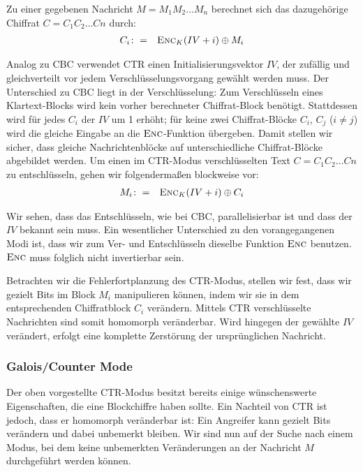 \noindent Zu einer gegebenen Nachricht \(M = M_1M_2 \dots M_n\) berechnet sich das dazugehörige Chiffrat \(C = C_1C_2 \dots Cn\) durch:
\begin{eqnarray*}
	C_i	& \colon=	& \textsc{Enc}_{K}(IV + i) \oplus M_i
\end{eqnarray*}

Analog zu CBC verwendet CTR einen Initialisierungsvektor \(IV\), der zufällig und gleichverteilt vor jedem Verschlüsselungsvorgang gewählt werden muss. Der Unterschied zu CBC liegt in der Verschlüsselung: Zum Verschlüsseln eines Klartext-Blocks wird kein vorher berechneter Chiffrat-Block benötigt. Stattdessen wird für jedes \(C_i\) der \(IV\) um 1 erhöht; für keine zwei Chiffrat-Blöcke \(C_i\), \(C_j\) (\(i \neq j\)) wird die gleiche Eingabe an die \(\textsc{Enc}\)-Funktion übergeben. Damit stellen wir sicher, dass gleiche Nachrichtenblöcke auf unterschiedliche Chiffrat-Blöcke abgebildet werden. Um einen im CTR-Modus verschlüsselten Text \(C = C_1C_2 \dots Cn\) zu entschlüsseln, gehen wir folgendermaßen blockweise vor:
\begin{eqnarray*}
	M_i	& \colon=	& \textsc{Enc}_{K}(IV + i) \oplus C_i
\end{eqnarray*}

Wir sehen, dass das Entschlüsseln, wie bei CBC, parallelisierbar ist und dass der \(IV\) bekannt sein muss. Ein wesentlicher Unterschied zu den vorangegangenen Modi ist, dass wir zum Ver- und Entschlüsseln dieselbe Funktion \(\textsc{Enc}\) benutzen. \(\textsc{Enc}\) muss folglich nicht invertierbar sein.

Betrachten wir die Fehlerfortplanzung des CTR-Modus, stellen wir fest, dass wir gezielt Bits im Block \(M_i\) manipulieren können, indem wir sie in dem entsprechenden Chiffratblock \(C_i\) verändern. Mittels CTR verschlüsselte Nachrichten sind somit homomorph veränderbar. Wird hingegen der gewählte \(IV\) verändert, erfolgt eine komplette Zerstörung der ursprünglichen Nachricht. 

\subsubsection{Galois/Counter Mode}

Der oben vorgestellte CTR-Modus besitzt bereits einige wünschenswerte Eigenschaften, die eine Blockchiffre haben sollte. Ein Nachteil von CTR ist jedoch, dass er homomorph veränderbar ist: Ein Angreifer kann gezielt Bits verändern und dabei unbemerkt bleiben. Wir sind nun auf der Suche nach einem Modus, bei dem keine unbemerkten Veränderungen an der Nachricht \(M\) durchgeführt werden können.

